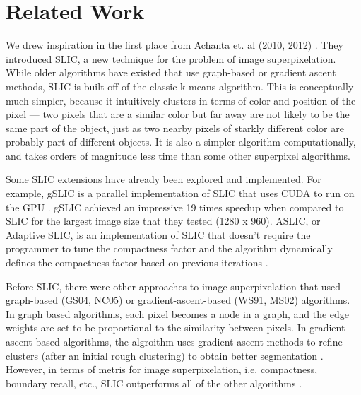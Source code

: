 \documentclass[11pt]{article}
\begin{document}
\section {Related Work}\label{rel}

We drew inspiration in the first place from Achanta et. al (2010, 2012) \cite{slic}\cite{slic2012}. They introduced SLIC, a new technique for the problem of image superpixelation. While older algorithms have existed that use graph-based or gradient ascent methods, SLIC is built off of the classic k-means algorithm. This is conceptually much simpler, because it intuitively clusters in terms of color and position of the pixel --- two pixels that are a similar color but far away are not likely to be the same part of the object, just as two nearby pixels of starkly different color are probably part of different objects. It is also a simpler algorithm computationally, and takes orders of magnitude less time than some other superpixel algorithms.

Some SLIC extensions have already been explored and implemented. For example, gSLIC is a parallel implementation of SLIC that uses CUDA to run on the GPU \cite{gslic}. gSLIC achieved an impressive 19 times speedup when compared to SLIC for the largest image size that they tested (1280 x 960). ASLIC, or Adaptive SLIC, is an implementation of SLIC that doesn't require the programmer to tune the compactness factor and the algorithm dynamically defines the compactness factor based on previous iterations \cite{slic2012}.

Before SLIC, there were other approaches to image superpixelation that used graph-based (GS04, NC05) or gradient-ascent-based (WS91, MS02) algorithms. In graph based algorithms, each pixel becomes a node in a graph, and the edge weights are set to be proportional to the similarity between pixels. In gradient ascent based algorithms, the algroithm uses gradient ascent methods to refine clusters (after an initial rough clustering) to obtain better segmentation \cite{slic}.  However, in terms of metris for image superpixelation, i.e. compactness, boundary recall, etc., SLIC outperforms all of the other algorithms \cite{slic}.\\
\end{document}
